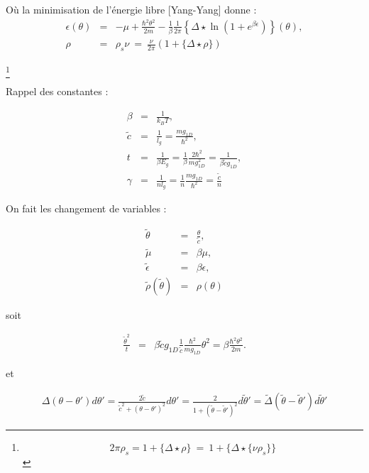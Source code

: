 Où la minimisation de l'énergie libre [Yang-Yang] donne :
\begin{eqnarray}
	\epsilon ( \theta ) & = & - \mu + \frac{\hbar^2 \theta^2 }{2 m} - \frac{1}{ \beta } \frac{1}{2 \pi} \left \{\Delta \star \ln \left ( 1 + e^{\beta \epsilon} \right )  \right \} ( \theta ), \\
	\rho &=&  \rho_s \nu   ~=~   \frac{\nu}{2 \pi } ( 1 + \{ \Delta \star \rho \} ) 	
\end{eqnarray}

\footnote{$$ 	2\pi \rho_s  =  1 + \{ \Delta \star \rho \} ~= ~ 1 + \{ \Delta \star \{\nu \rho_s\} \} $$}

Rappel des constantes :

\begin{eqnarray*}
	\beta & = & \frac{1}{ k_B T} ,\\
	\tilde{c} & =& \frac{1}{l_g}  = \frac{ m g_{1D}}{\hbar^2},\\
	t & = & \frac{1}{\beta E_g} = \frac{1}{ \beta} \frac{2 \hbar^2 }	{ m g_{1D}^2 } = \frac{1}{ \beta  \tilde{c} g_{1D} },\\
	\gamma & = & \frac{1}{n l_g } = \frac{1}{n} \frac{ m g_{1D}}{\hbar^2} = \frac{\tilde{c}}{n} 
\end{eqnarray*}

On fait les changement de variables :

\begin{eqnarray*}
	\tilde{\theta} & = & \frac{\theta}{\tilde {c}},\\
	\tilde{\mu} & =& \beta \mu ,\\
	\tilde{\epsilon} & = & \beta \epsilon , \\
	\tilde{\rho}(\tilde{\theta}) & = & \rho ( \theta ) 	
\end{eqnarray*}

soit 

\begin{eqnarray*}
	\frac{\tilde{\theta}^2}{t}	 & = & \beta \tilde{c} g_{1D} \frac{1}{\tilde{c}} \frac{\hbar^2}{m g_{1D}} \theta^2 = \beta \frac{ \hbar^2 \theta^2}{2 m}.
\end{eqnarray*}

et 

\begin{eqnarray*}
	\Delta ( \theta - \theta' ) d\theta' = \frac{2 \tilde{c}}{ \tilde{c}^2 + ( \theta - \theta')^2 } d \theta' = \frac{2}{ 1 + ( \tilde{\theta} - \tilde{\theta}')^2 } d\tilde{\theta}' = \tilde{\Delta} ( \tilde{\theta} - \tilde{\theta}') d \tilde{\theta}' 	
\end{eqnarray*}

